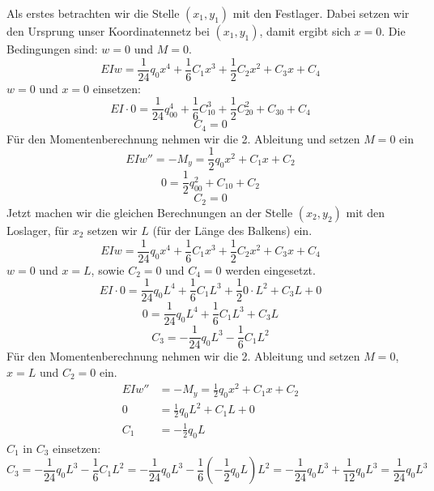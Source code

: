 Als erstes betrachten wir die Stelle $(x_1, y_1)$ mit den Festlager.
Dabei setzen wir den Ursprung unser Koordinatennetz bei $(x_1, y_1)$, damit ergibt sich $x = 0$.
Die Bedingungen sind: $w = 0$ und $M = 0$.
\begin{equation}
	EIw=
	\frac{1}{24}q_0x^4+\frac{1}{6}C_1x^3+\frac{1}{2}C_2x^2+C_3x+C_4
\end{equation}
$w = 0$ und $x = 0$ einsetzen:
\begin{equation}
	EI\cdot0=
	\frac{1}{24}q_00^4+\frac{1}{6}C_10^3+\frac{1}{2}C_20^2+C_30+C_4
\end{equation}
\begin{equation}
	C_4=
	0
\end{equation}
Für den Momentenberechnung nehmen wir die 2. Ableitung und setzen $M = 0$ ein
\begin{equation}
	EIw''=
	-M_y=
	\frac{1}{2}q_0x^2+C_1x+C_2
\end{equation}
\begin{equation}
	0=
	\frac{1}{2}q_00^2+C_10+C_2
\end{equation}
\begin{equation}
	C_2=
	0
\end{equation}
Jetzt machen wir die gleichen Berechnungen an der Stelle $(x_2, y_2)$ mit den Loslager, für $x_2$ setzen wir $L$ (für der Länge des Balkens) ein.
\begin{equation}
	EIw=
	\frac{1}{24}q_0x^4+\frac{1}{6}C_1x^3+\frac{1}{2}C_2x^2+C_3x+C_4
\end{equation}
$w = 0$ und $x = L$, sowie $C_2 = 0$ und $C_4 = 0$ werden eingesetzt.
\begin{equation}
	EI\cdot0=
	\frac{1}{24}q_0L^4+\frac{1}{6}C_1L^3+\frac{1}{2}0\cdot L^2+C_3L+0
\end{equation}
\begin{equation}
	0=
	\frac{1}{24}q_0L^4+\frac{1}{6}C_1L^3+C_3L
\end{equation}
\begin{equation}
	C_3=
	-\frac{1}{24}q_0L^3-\frac{1}{6}C_1L^2
\end{equation}
Für den Momentenberechnung nehmen wir die 2. Ableitung und setzen $M = 0$, $x = L$ und $C_2 = 0$ ein.
\begin{align}
		EIw''&=
		-M_y=\frac{1}{2}q_0x^2+C_1x+C_2
    \\
		0 &=
		\frac{1}{2}q_0L^2+C_1L+0
    \\
		C_1&=
		-\frac{1}{2}q_0L
\end{align}
$C_1$ in $C_3$ einsetzen:
\begin{equation}
	C_3=
	-\frac{1}{24}q_0L^3-\frac{1}{6}C_1L^2
	=	-\frac{1}{24}q_0L^3-\frac{1}{6}\left(-\frac{1}{2}q_0L\right)L^2
	=	-\frac{1}{24}q_0L^3+\frac{1}{12}q_0L^3
	=	\frac{1}{24}q_0L^3
\end{equation}
